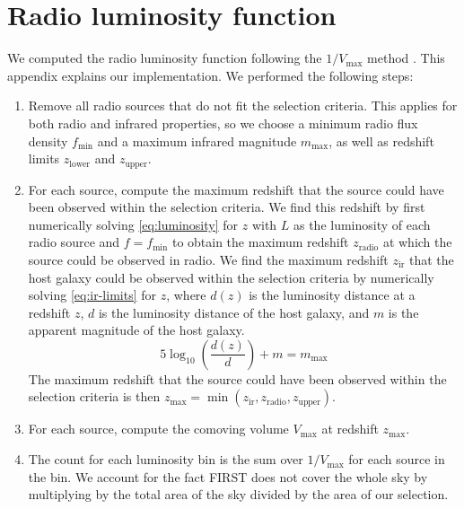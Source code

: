 \section{Radio luminosity function}
\label{sec:rlf-desc}

  We computed the radio luminosity function following the $1/V_{\max}$ method
  \citep{schmidt1968vmax}. This appendix explains our implementation. We performed the
  following steps:
  \begin{enumerate}
    \item Remove all radio sources that do not fit the selection criteria.
      This applies for both radio and infrared properties, so we choose a minimum radio flux density $f_{\min}$ and a maximum infrared magnitude
      $m_{\max}$, as well as redshift limits $z_{\mathrm{lower}}$ and $z_{\mathrm{upper}}$.
    \item For each source, compute the maximum redshift that the source could
      have been observed within the selection criteria. We find this redshift
      by first numerically solving \autoref{eq:luminosity} for $z$ with $L$ as
      the luminosity of each radio source and $f = f_{\min}$ to obtain the
      maximum redshift $z_\text{radio}$ at which the source could be observed
      in radio. We find the maximum redshift $z_{\text{ir}}$ that the host
      galaxy could be observed within the selection criteria by numerically
      solving \autoref{eq:ir-limits} for $z$, where $d(z)$ is the luminosity
      distance at a redshift $z$, $d$ is the luminosity distance of the host
      galaxy, and $m$ is the apparent magnitude of the host galaxy.
      \begin{equation}
        \label{eq:ir-limits}
        5 \log_{10}\left(\frac{d(z)}{d}\right) + m = m_{\max}
      \end{equation}
      The maximum redshift that the source could have been observed within the
      selection criteria is then $z_{\mathrm{max}} = \min(z_{\mathrm{ir}}, z_{\mathrm{radio}}, z_{\mathrm{upper}})$.
    \item For each source, compute the comoving volume $V_{\mathrm{max}}$ at
      redshift $z_{\mathrm{max}}$.
    \item The count for each luminosity bin is the sum over $1 / V_{\max}$ for
      each source in the bin. We account for the fact FIRST does not cover the
      whole sky by multiplying by the total area of the sky divided by the area
      of our selection.
  \end{enumerate}

